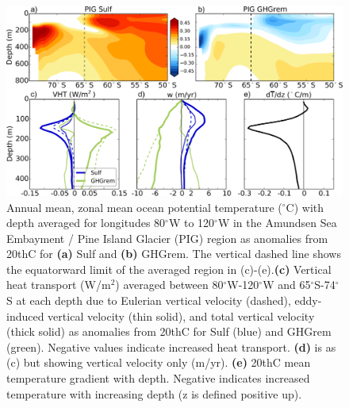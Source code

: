 \documentclass[draft,grl]{AGUTeX}  %
\begin{document}
\begin{article}


\begin{figure}[htbp] %
\centering
 \noindent\includegraphics[width=35pc]{figures/TEMPanomvertheat_justPIG.pdf}
\caption{Annual mean, zonal mean ocean potential temperature ($^\circ$C) with depth averaged for longitudes 80$^\circ$W to 120$^\circ$W in the Amundsen Sea Embayment / Pine Island Glacier (PIG) region as anomalies from 20thC for \textbf{(a)} Sulf and \textbf{(b)} GHGrem. The vertical dashed line shows the equatorward limit of the averaged region in (c)-(e).\textbf{(c)} Vertical heat transport (W/m$^2$) averaged between 80$^\circ$W-120$^\circ$W and 65$^\circ$S-74$^\circ$S at each depth due to Eulerian vertical velocity (dashed), eddy-induced vertical velocity (thin solid), and total vertical velocity (thick solid) as anomalies from 20thC for Sulf (blue) and GHGrem (green). Negative values indicate increased heat transport. \textbf{(d)} is as (c) but showing vertical velocity only (m/yr). \textbf{(e)} 20thC mean temperature gradient with depth. Negative indicates increased temperature with increasing depth (z is defined positive up).}
\label{fig:pigtemp}
\end{figure}



\end{article}
\end{document}
